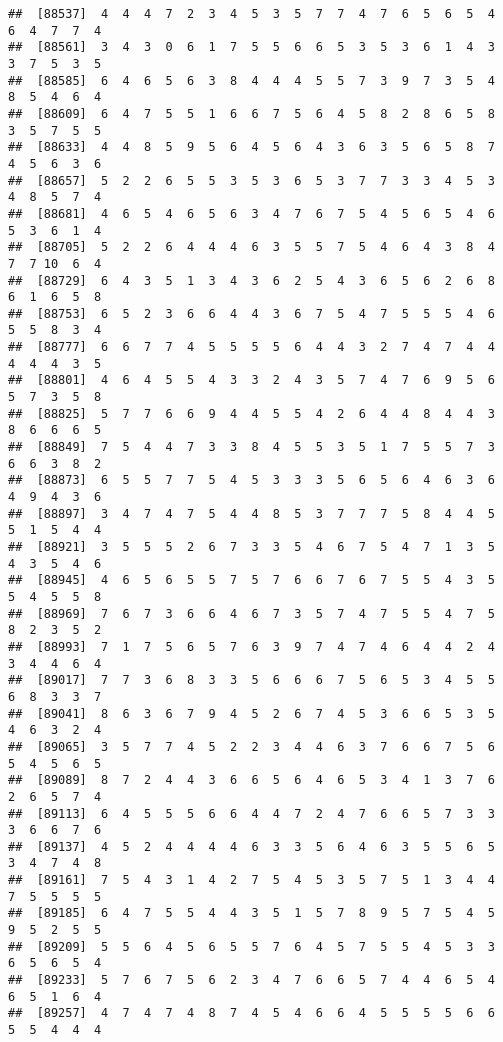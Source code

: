 \documentclass[
]{book}
\begin{document}
\begin{verbatim}
##  [88537]  4  4  4  7  2  3  4  5  3  5  7  7  4  7  6  5  6  5  4  6  4  7  7  4
##  [88561]  3  4  3  0  6  1  7  5  5  6  6  5  3  5  3  6  1  4  3  3  7  5  3  5
##  [88585]  6  4  6  5  6  3  8  4  4  4  5  5  7  3  9  7  3  5  4  8  5  4  6  4
##  [88609]  6  4  7  5  5  1  6  6  7  5  6  4  5  8  2  8  6  5  8  3  5  7  5  5
##  [88633]  4  4  8  5  9  5  6  4  5  6  4  3  6  3  5  6  5  8  7  4  5  6  3  6
##  [88657]  5  2  2  6  5  5  3  5  3  6  5  3  7  7  3  3  4  5  3  4  8  5  7  4
##  [88681]  4  6  5  4  6  5  6  3  4  7  6  7  5  4  5  6  5  4  6  5  3  6  1  4
##  [88705]  5  2  2  6  4  4  4  6  3  5  5  7  5  4  6  4  3  8  4  7  7 10  6  4
##  [88729]  6  4  3  5  1  3  4  3  6  2  5  4  3  6  5  6  2  6  8  6  1  6  5  8
##  [88753]  6  5  2  3  6  6  4  4  3  6  7  5  4  7  5  5  5  4  6  5  5  8  3  4
##  [88777]  6  6  7  7  4  5  5  5  5  6  4  4  3  2  7  4  7  4  4  4  4  4  3  5
##  [88801]  4  6  4  5  5  4  3  3  2  4  3  5  7  4  7  6  9  5  6  5  7  3  5  8
##  [88825]  5  7  7  6  6  9  4  4  5  5  4  2  6  4  4  8  4  4  3  8  6  6  6  5
##  [88849]  7  5  4  4  7  3  3  8  4  5  5  3  5  1  7  5  5  7  3  6  6  3  8  2
##  [88873]  6  5  5  7  7  5  4  5  3  3  3  5  6  5  6  4  6  3  6  4  9  4  3  6
##  [88897]  3  4  7  4  7  5  4  4  8  5  3  7  7  7  5  8  4  4  5  5  1  5  4  4
##  [88921]  3  5  5  5  2  6  7  3  3  5  4  6  7  5  4  7  1  3  5  4  3  5  4  6
##  [88945]  4  6  5  6  5  5  7  5  7  6  6  7  6  7  5  5  4  3  5  5  4  5  5  8
##  [88969]  7  6  7  3  6  6  4  6  7  3  5  7  4  7  5  5  4  7  5  8  2  3  5  2
##  [88993]  7  1  7  5  6  5  7  6  3  9  7  4  7  4  6  4  4  2  4  3  4  4  6  4
##  [89017]  7  7  3  6  8  3  3  5  6  6  6  7  5  6  5  3  4  5  5  6  8  3  3  7
##  [89041]  8  6  3  6  7  9  4  5  2  6  7  4  5  3  6  6  5  3  5  4  6  3  2  4
##  [89065]  3  5  7  7  4  5  2  2  3  4  4  6  3  7  6  6  7  5  6  5  4  5  6  5
##  [89089]  8  7  2  4  4  3  6  6  5  6  4  6  5  3  4  1  3  7  6  2  6  5  7  4
##  [89113]  6  4  5  5  5  6  6  4  4  7  2  4  7  6  6  5  7  3  3  3  6  6  7  6
##  [89137]  4  5  2  4  4  4  4  6  3  3  5  6  4  6  3  5  5  6  5  3  4  7  4  8
##  [89161]  7  5  4  3  1  4  2  7  5  4  5  3  5  7  5  1  3  4  4  7  5  5  5  5
##  [89185]  6  4  7  5  5  4  4  3  5  1  5  7  8  9  5  7  5  4  5  9  5  2  5  5
##  [89209]  5  5  6  4  5  6  5  5  7  6  4  5  7  5  5  4  5  3  3  6  5  6  5  4
##  [89233]  5  7  6  7  5  6  2  3  4  7  6  6  5  7  4  4  6  5  4  6  5  1  6  4
##  [89257]  4  7  4  7  4  8  7  4  5  4  6  6  4  5  5  5  5  6  6  5  5  4  4  4

\end{verbatim}
\end{document}
